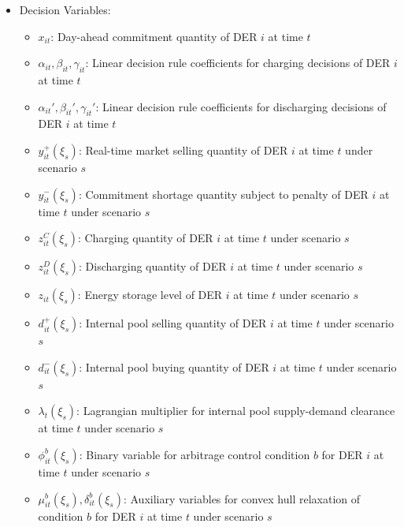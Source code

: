 \documentclass[10pt]{article}
\begin{document}
\begin{itemize}[leftmargin=*]
\begin{itemize}[leftmargin=*]
        \item $\pi_s$: Probability of occurrence of scenario $s$ 
    \end{itemize}
    \item Decision Variables:
    \begin{itemize}[leftmargin=*]\normalsize
        \item $x_{it}$: Day-ahead commitment quantity of DER $i$ at time $t$
        \item $\alpha_{it}, \beta_{it}, \gamma_{it}$: Linear decision rule coefficients for charging decisions of DER $i$ at time $t$
        \item $\alpha_{it}', \beta_{it}', \gamma_{it}'$: Linear decision rule coefficients for discharging decisions of DER $i$ at time $t$
        \item $y^{+}_{it}(\xi_s)$: Real-time market selling quantity of DER $i$ at time $t$ under scenario $s$
        \item $y^{-}_{it}(\xi_s)$: Commitment shortage quantity subject to penalty of DER $i$ at time $t$ under scenario $s$
        \item $z^{C}_{it}(\xi_s)$: Charging quantity of DER $i$ at time $t$ under scenario $s$
        \item $z^{D}_{it}(\xi_s)$: Discharging quantity of DER $i$ at time $t$ under scenario $s$
        \item $z_{it}(\xi_s)$: Energy storage level of DER $i$ at time $t$ under scenario $s$
        \item $d^{+}_{it}(\xi_s)$: Internal pool selling quantity of DER $i$ at time $t$ under scenario $s$
        \item $d^{-}_{it}(\xi_s)$: Internal pool buying quantity of DER $i$ at time $t$ under scenario $s$
        \item $\lambda_{t}(\xi_s)$: Lagrangian multiplier for internal pool supply-demand clearance at time $t$ under scenario $s$
        \item $\phi_{it}^{b}(\xi_s)$: Binary variable for arbitrage control condition $b$ for DER $i$ at time $t$ under scenario $s$
        \item $\mu_{it}^{b}(\xi_s), \delta_{it}^{b}(\xi_s)$: Auxiliary variables for convex hull relaxation of condition $b$ for DER $i$ at time $t$ under scenario $s$
    \end{itemize}
\end{itemize}
\end{document}
